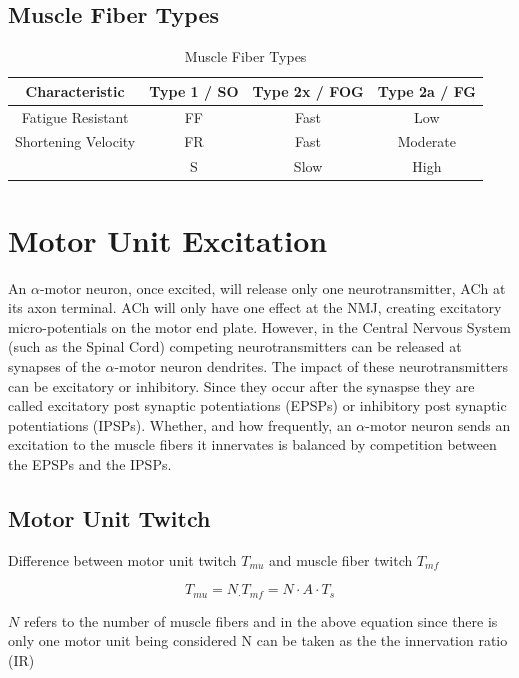 \subsection{Muscle Fiber Types}


\begin{table}[h!]
\centering
\begin{tabular}{||c c c c ||} 
 \hline
Characteristic & Type 1 / SO & Type 2x / FOG & Type 2a / FG \\ 
 \hline\hline
 Fatigue Resistant & FF & Fast & Low \\ 
 Shortening Velocity & FR & Fast & Moderate \\
  & S & Slow & High \\ [1ex] 
 \hline
\end{tabular}
\caption{Muscle Fiber Types}
\label{table:Motor_Unit_Types}
\end{table}


\section{Motor Unit Excitation}

An $\alpha$-motor neuron, once excited, will release only one neurotransmitter, ACh at its axon terminal. ACh will only have one effect at the NMJ, creating excitatory micro-potentials on the motor end plate. However, in the Central Nervous System (such as the Spinal Cord) competing neurotransmitters can be released at synapses of the $\alpha$-motor neuron dendrites. The impact of these neurotransmitters can be excitatory or inhibitory. Since they occur after the synaspse they are called excitatory post synaptic potentiations (EPSPs) or inhibitory post synaptic potentiations (IPSPs). Whether, and how frequently, an $\alpha$-motor neuron sends an excitation to the muscle fibers it innervates is balanced by competition between the EPSPs and the IPSPs.



\subsection{Motor Unit Twitch}

Difference between motor unit twitch $T_{mu}$ and muscle fiber twitch $T_{mf}$


\begin{equation}
    T_{mu} = N_ \cdot T_{mf} = N \cdot A \cdot T_s
\end{equation}

$N$ refers to the number of muscle fibers and in the above equation since there is only one motor unit being considered N can be taken as the the innervation ratio (IR)

